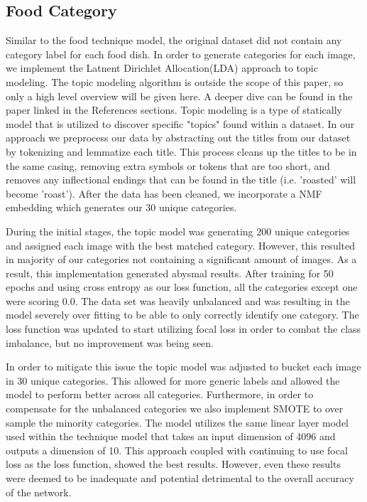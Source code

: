 \documentclass[10pt,twocolumn,letterpaper]{article}
\begin{document}
\subsection{Food Category}
Similar to the food technique model, the original dataset did not contain any category label for each food dish. In order to generate categories for each image, we implement the Latnent Dirichlet Allocation(LDA) approach to topic modeling. The topic modeling algorithm is outside the scope of this paper, so only a high level overview will be given here\cite{Authors03}. A deeper dive can be found in the paper linked in the References sections. Topic modeling is a type of statically model that is utilized to discover specific "topics" found within a dataset. In our approach we preprocess our data by abstracting out the titles from our dataset by tokenizing and lemmatize each title. This process cleans up the titles to be in the same casing, removing extra symbols or tokens that are too short, and removes any inflectional endings that can be found in the title (i.e. 'roasted' will become 'roast'). After the data has been cleaned, we incorporate a NMF embedding which generates our 30 unique categories. 

During the initial stages, the topic model was generating 200 unique categories and assigned each image with the best matched category. However, this resulted in majority of our categories not containing a significant amount of images. As a result, this implementation generated abysmal results. After training for 50 epochs and using cross entropy as our loss function, all the categories except one were scoring 0.0. The data set was heavily unbalanced and was resulting in the model severely over fitting to be able to only correctly identify one category. The loss function was updated to start utilizing focal loss in order to combat the class imbalance, but no improvement was being seen. 

In order to mitigate this issue the topic model was adjusted to bucket each image in 30 unique categories. This allowed for more generic labels and allowed the model to perform better across all categories. Furthermore, in order to compensate for the unbalanced categories we also implement SMOTE to over sample the minority categories. The model utilizes the same linear layer model used within the technique model that takes an input dimension of 4096 and outputs a dimension of 10. This approach coupled with continuing to use focal loss as the loss function, showed the best results. However, even these results were deemed to be inadequate and potential detrimental to the overall accuracy of the network. 
\end{document}

